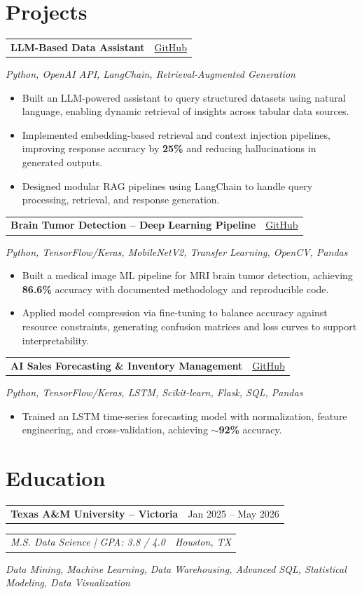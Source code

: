 \documentclass[10pt,letterpaper]{article}
\makeatletter
\newcommand{\roleheading}[2]{%
  \begin{tabularx}{\linewidth}{@{}X r@{}}
    \textbf{\small\color{dark}#1} & \small\textcolor{muted}{#2}
  \end{tabularx}\vspace{-1pt}\par
}
\newcommand{\orgline}[2]{%
  \begin{tabularx}{\linewidth}{@{}X r@{}}
    \textit{\footnotesize\textcolor{muted}{#1}} &
    \textit{\footnotesize\textcolor{muted}{#2}}
  \end{tabularx}\vspace{1pt}\par
}
\newcommand{\toolsline}[1]{%
  \textit{\footnotesize\textcolor{muted}{#1}}\vspace{2pt}\par
}
\makeatother
\begin{document}
\section{Projects}

\roleheading{LLM-Based Data Assistant}{\href{https://github.com/jonathanrao99}{GitHub}}
\toolsline{Python, OpenAI API, LangChain, Retrieval-Augmented Generation}
\begin{itemize}\footnotesize
  \item Built an LLM-powered assistant to query structured datasets using natural language, enabling dynamic retrieval of insights across tabular data sources.
  \item Implemented embedding-based retrieval and context injection pipelines, improving response accuracy by \textbf{25\%} and reducing hallucinations in generated outputs.
  \item Designed modular RAG pipelines using LangChain to handle query processing, retrieval, and response generation.
\end{itemize}

\vspace{2pt}

\roleheading{Brain Tumor Detection -- Deep Learning Pipeline}{\href{https://github.com/jonathanrao99}{GitHub}}
\toolsline{Python, TensorFlow/Keras, MobileNetV2, Transfer Learning, OpenCV, Pandas}
\begin{itemize}\footnotesize
  \item Built a medical image ML pipeline for MRI brain tumor detection, achieving \textbf{86.6\%} accuracy with documented methodology and reproducible code.
  \item Applied model compression via fine-tuning to balance accuracy against resource constraints, generating confusion matrices and loss curves to support interpretability.
\end{itemize}

\vspace{2pt}

\roleheading{AI Sales Forecasting \& Inventory Management}{\href{https://github.com/jonathanrao99}{GitHub}}
\toolsline{Python, TensorFlow/Keras, LSTM, Scikit-learn, Flask, SQL, Pandas}
\begin{itemize}\footnotesize
  \item Trained an LSTM time-series forecasting model with normalization, feature engineering, and cross-validation, achieving $\sim$\textbf{92\%} accuracy.
\end{itemize}

\section{Education}

\roleheading{Texas A\&M University -- Victoria}{Jan 2025 -- May 2026}
\orgline{M.S. Data Science \;|\; GPA: 3.8 / 4.0}{Houston, TX}
\vspace{1pt}
\footnotesize\textit{Data Mining, Machine Learning, Data Warehousing, Advanced SQL, Statistical Modeling, Data Visualization}
\end{document}
